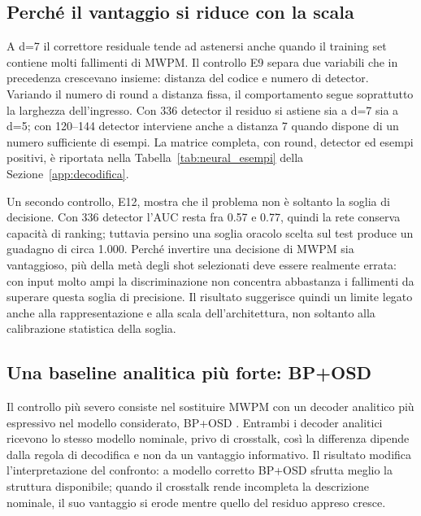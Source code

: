 \subsection{Perché il vantaggio si riduce con la scala}\label{sec:finale_5_3_4}

A d=7 il correttore residuale tende ad astenersi anche quando il training set contiene molti fallimenti di MWPM. Il controllo E9 separa due variabili che in precedenza crescevano insieme: distanza del codice e numero di detector. Variando il numero di round a distanza fissa, il comportamento segue soprattutto la larghezza dell'ingresso. Con 336 detector il residuo si astiene sia a d=7 sia a d=5; con 120--144 detector interviene anche a distanza 7 quando dispone di un numero sufficiente di esempi. La matrice completa, con round, detector ed esempi positivi, è riportata nella Tabella~\ref{tab:neural_esempi} della Sezione~\ref{app:decodifica}.

Un secondo controllo, E12, mostra che il problema non è soltanto la soglia di decisione. Con 336 detector l'AUC resta fra 0.57 e 0.77, quindi la rete conserva capacità di ranking; tuttavia persino una soglia oracolo scelta sul test produce un guadagno di circa 1.000. Perché invertire una decisione di MWPM sia vantaggioso, più della metà degli shot selezionati deve essere realmente errata: con input molto ampi la discriminazione non concentra abbastanza i fallimenti da superare questa soglia di precisione. Il risultato suggerisce quindi un limite legato anche alla rappresentazione e alla scala dell'architettura, non soltanto alla calibrazione statistica della soglia.

\subsection{Una baseline analitica più forte: BP+OSD}\label{sec:finale_5_3_5}

Il controllo più severo consiste nel sostituire MWPM con un decoder analitico più espressivo nel modello considerato, BP+OSD \cite{roffe2020,panteleev2021}. Entrambi i decoder analitici ricevono lo stesso modello nominale, privo di crosstalk, così la differenza dipende dalla regola di decodifica e non da un vantaggio informativo. Il risultato modifica l'interpretazione del confronto: a modello corretto BP+OSD sfrutta meglio la struttura disponibile; quando il crosstalk rende incompleta la descrizione nominale, il suo vantaggio si erode mentre quello del residuo appreso cresce.

